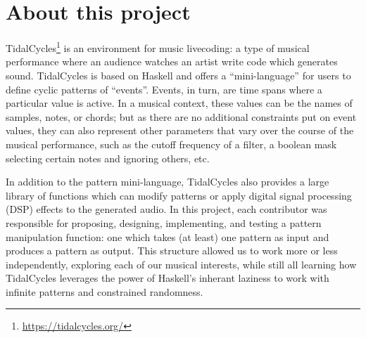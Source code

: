 \section{About this project}

TidalCycles\footnote{\url{https://tidalcycles.org/}} is an environment for music livecoding:
a type of musical performance where an audience watches an artist write code which generates sound.
TidalCycles is based on Haskell and offers a ``mini-language'' for users to define cyclic patterns of ``events''.
Events, in turn, are time spans where a particular value is active.
In a musical context, these values can be the names of samples, notes, or chords;
but as there are no additional constraints put on event values,
they can also represent other parameters that vary over the course of the musical performance,
such as the cutoff frequency of a filter,
a boolean mask selecting certain notes and ignoring others,
etc.

In addition to the pattern mini-language,
TidalCycles also provides a large library of functions which can modify patterns or apply digital signal processing (DSP) effects to the generated audio.
In this project,
each contributor was responsible for proposing, designing, implementing, and testing a pattern manipulation function:
one which takes (at least) one pattern as input and produces a pattern as output.
This structure allowed us to work more or less independently,
exploring each of our musical interests,
while still all learning how TidalCycles leverages the power of Haskell's inherant laziness
to work with infinite patterns and constrained randomness.
